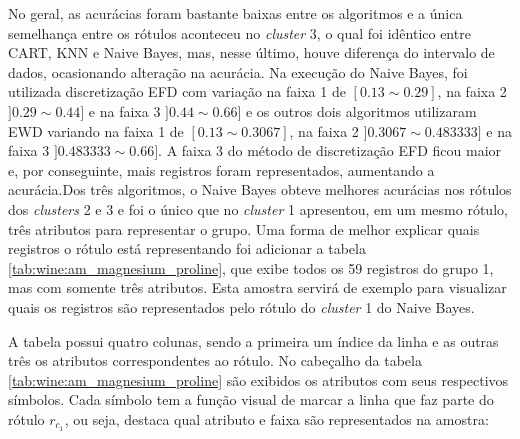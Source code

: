 No geral, as acurácias foram bastante baixas entre os algoritmos e a única semelhança entre os rótulos aconteceu no \textit{cluster} 3, o qual foi idêntico entre CART, KNN e Naive Bayes, mas, nesse último, houve diferença do intervalo de dados, ocasionando alteração na acurácia. Na execução do Naive Bayes, foi utilizada discretização EFD com variação na faixa 1 de ${[0.13 \sim 0.29]}$, na faixa 2 ${]0.29 \sim 0.44]}$ e na faixa 3 ${]0.44 \sim 0.66]}$ e os outros dois algoritmos utilizaram EWD variando na faixa 1 de ${[0.13 \sim 0.3067]}$, na faixa 2  ${]0.3067 \sim 0.483333]}$ e na faixa 3 ${]0.483333 \sim 0.66]}$. A faixa 3 do método de discretização EFD ficou maior e, por conseguinte, mais registros foram representados, aumentando a acurácia.Dos três algoritmos, o Naive Bayes obteve melhores acurácias nos rótulos dos \textit{clusters} 2 e 3 e foi o único que no \textit{cluster} 1 apresentou, em um mesmo rótulo, três atributos para representar o grupo. Uma forma de melhor explicar quais registros o rótulo está representando foi adicionar a tabela \ref{tab:wine:am_magnesium_proline}, que exibe todos os 59 registros do grupo 1, mas com somente três atributos. Esta amostra servirá de exemplo para visualizar quais os registros são representados pelo rótulo do \textit{cluster} 1 do Naive Bayes. 



A tabela possui quatro colunas, sendo a primeira um índice da linha e as outras três os atributos correspondentes ao rótulo. No cabeçalho da tabela \ref{tab:wine:am_magnesium_proline} são exibidos os atributos com seus respectivos símbolos. Cada símbolo tem a função visual de marcar a linha que faz parte do rótulo ${r_{c_1}}$, ou seja, destaca qual atributo e faixa são representados na amostra: 

